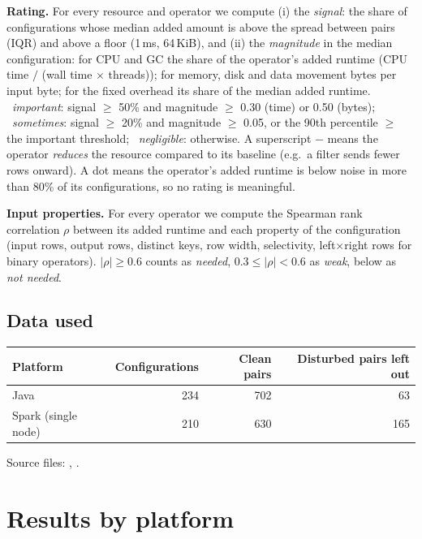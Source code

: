 \documentclass[11pt,a4paper]{article}
\providecommand{\high}{\CIRCLE}\providecommand{\some}{\LEFTcircle}\providecommand{\low}{\Circle}
\begin{document}
\textbf{Rating.} For every resource and operator we compute (i) the \emph{signal}: the share of configurations whose median added amount is above the spread between pairs (IQR) and above a floor (1\,ms, 64\,KiB), and (ii) the \emph{magnitude} in the median configuration: for CPU and GC the share of the operator's added runtime (CPU time $/$ (wall time $\times$ threads)); for memory, disk and data movement bytes per input byte; for the fixed overhead its share of the median added runtime. \high~\emph{important}: signal $\geq$ 50\% and magnitude $\geq$ 0.30 (time) or 0.50 (bytes); \some~\emph{sometimes}: signal $\geq$ 20\% and magnitude $\geq$ 0.05, or the 90th percentile $\geq$ the important threshold; \low~\emph{negligible}: otherwise. A superscript $-$ means the operator \emph{reduces} the resource compared to its baseline (e.g.\ a filter sends fewer rows onward). A dot means the operator's added runtime is below noise in more than 80\% of its configurations, so no rating is meaningful.

\textbf{Input properties.} For every operator we compute the Spearman rank correlation $\rho$ between its added runtime and each property of the configuration (input rows, output rows, distinct keys, row width, selectivity, left$\times$right rows for binary operators). $|\rho|\geq 0.6$ counts as \emph{needed}, $0.3\leq|\rho|<0.6$ as \emph{weak}, below as \emph{not needed}.
\subsection*{Data used}
\begin{center}\small\begin{tabular}{lrrr}\toprule Platform & Configurations & Clean pairs & Disturbed pairs left out\\\midrule

Java & 234 & 702 & 63\\

Spark (single node) & 210 & 630 & 165\\
\bottomrule\end{tabular}\end{center}

Source files: , .
\section{Results by platform}
\end{document}
